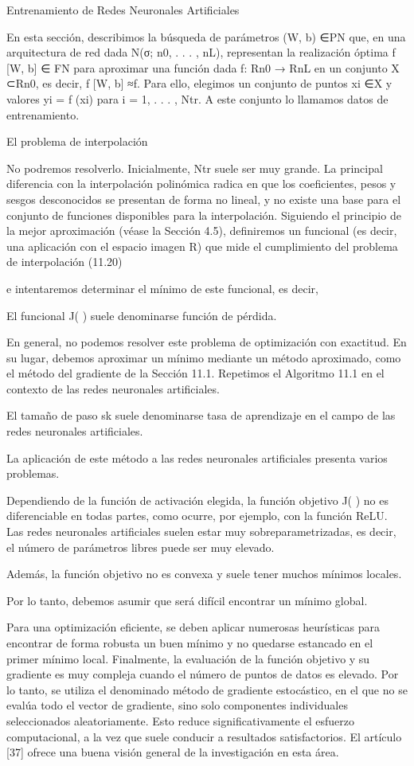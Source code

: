 \begin{frame}
  Entrenamiento de Redes Neuronales Artificiales

  En esta sección, describimos la búsqueda de parámetros (W, b) ∈PN que, en una arquitectura de red dada N(σ; n0, . . . , nL), representan la realización óptima f [W, b] ∈
  FN para aproximar una función dada f: Rn0 → RnL en un conjunto X ⊂Rn0, es decir, f [W, b] ≈f. Para ello, elegimos un conjunto de puntos xi ∈X y valores yi = f (xi) para i = 1, . . . , Ntr. A este conjunto lo llamamos datos de entrenamiento.

  El problema de interpolación

  No podremos resolverlo. Inicialmente, Ntr suele ser muy grande. La principal diferencia con la interpolación polinómica radica en que los coeficientes, pesos y sesgos desconocidos se presentan de forma no lineal, y no existe una base para el conjunto de funciones disponibles para la interpolación. Siguiendo el principio de la mejor aproximación (véase la Sección 4.5), definiremos un funcional (es decir, una aplicación con el espacio imagen R) que mide el cumplimiento del problema de interpolación (11.20)

  e intentaremos determinar el mínimo de este funcional, es decir,

  El funcional J( ) suele denominarse función de pérdida.

  En general, no podemos resolver este problema de optimización con exactitud. En su lugar, debemos aproximar un mínimo mediante un método aproximado, como el método del gradiente de la Sección 11.1. Repetimos el Algoritmo 11.1 en el contexto de las redes neuronales artificiales.

  El tamaño de paso sk suele denominarse tasa de aprendizaje en el campo de las redes neuronales artificiales.

  La aplicación de este método a las redes neuronales artificiales presenta varios problemas.

  Dependiendo de la función de activación elegida, la función objetivo J( ) no es diferenciable en todas partes, como ocurre, por ejemplo, con la función ReLU. Las redes neuronales artificiales suelen estar muy sobreparametrizadas, es decir, el número de parámetros libres puede ser muy elevado.

  Además, la función objetivo no es convexa y suele tener muchos mínimos locales.

  Por lo tanto, debemos asumir que será difícil encontrar un mínimo global.

  Para una optimización eficiente, se deben aplicar numerosas heurísticas para encontrar de forma robusta un buen mínimo y no quedarse estancado en el primer mínimo local. Finalmente, la evaluación de la función objetivo y su gradiente es muy compleja cuando el número de puntos de datos es elevado. Por lo tanto, se utiliza el denominado método de gradiente estocástico, en el que no se evalúa todo el vector de gradiente, sino solo componentes individuales seleccionados aleatoriamente. Esto reduce significativamente el esfuerzo computacional, a la vez que suele conducir a resultados satisfactorios. El artículo [37] ofrece una buena visión general de la investigación en esta área.
\end{frame}

